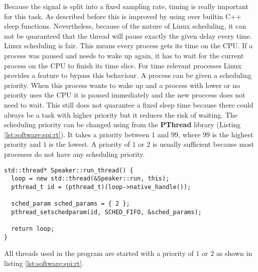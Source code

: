 Because the signal is split into a fixed sampling rate, timing is really important for this task. As described before this is improved by using  over builtin C++ sleep functions. Nevertheless, because of the nature of Linux scheduling, it can not be quaranteed that the thread will pause exactly the given delay every time. Linux scheduling is fair. This means every process gets its time on the CPU. If a process was paused and needs to wake up again, it has to wait for the current process on the CPU to finish its time slice. For time relevant processes Linux provides a feature to bypass this behaviour. A process can be given a scheduling priority. When this process wants to wake up and a process with lower or no priority uses the CPU it is paused immediately and the new proccess does not need to wait. This still does not quarantee a fixed sleep time because there could always be a task with higher priority but it reduces the risk of waiting.\cite{faschingbauer_realtime_nodate}\p
%
The scheduling priority can be changed using  from the \textbf{PThread} library (Listing \ref{lst:software:spi:rt}). It takes a priority between $1$ and $99$, where $99$ is the highest priority and $1$ is the lowest. A priority of $1$ or $2$ is usually sufficient because most processes do not have any scheduling priority.\cite{noauthor_pthread_setschedparam3_nodate}
%
\begin{mdframed}
\begin{lstlisting}[caption=Example for creating a thread with realtime priority, label=lst:software:spi:rt]
std::thread* Speaker::run_thread() {
  loop = new std::thread(&Speaker::run, this);
  pthread_t id = (pthread_t)(loop->native_handle());

  sched_param sched_params = { 2 };
  pthread_setschedparam(id, SCHED_FIFO, &sched_params);

  return loop;
}
\end{lstlisting}
\end{mdframed}
%
All threads used in the program are started with a priority of $1$ or $2$ as shown in listing \ref{lst:software:spi:rt}.